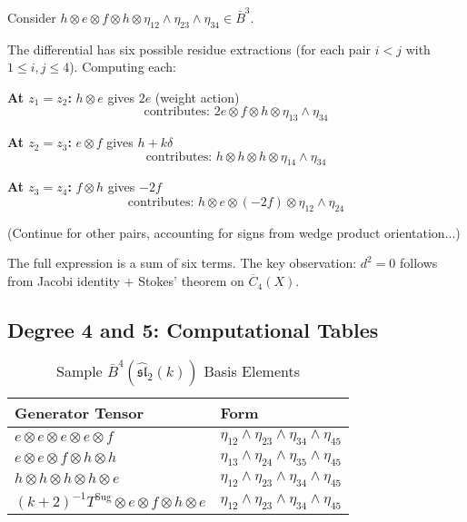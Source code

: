 \begin{computation}
Consider $h \otimes e \otimes f \otimes h \otimes \eta_{12} \wedge \eta_{23} \wedge \eta_{34} \in \bar{B}^3$.

The differential has six possible residue extractions (for each pair $i<j$ with $1 \le i,j \le 4$). Computing each:

\textbf{At $z_1=z_2$:} $h \otimes e$ gives $2e$ (weight action)
$$\text{contributes: } 2e \otimes f \otimes h \otimes \eta_{13} \wedge \eta_{34}$$

\textbf{At $z_2=z_3$:} $e \otimes f$ gives $h + k\delta$
$$\text{contributes: } h \otimes h \otimes h \otimes \eta_{14} \wedge \eta_{34}$$

\textbf{At $z_3=z_4$:} $f \otimes h$ gives $-2f$ 
$$\text{contributes: } h \otimes e \otimes (-2f) \otimes \eta_{12} \wedge \eta_{24}$$

(Continue for other pairs, accounting for signs from wedge product orientation...)

The full expression is a sum of six terms. The key observation: $d^2 = 0$ follows from Jacobi identity + Stokes' theorem on $\overline{C}_4(X)$.
\end{computation}

\subsection{Degree 4 and 5: Computational Tables}

\begin{table}[h]
\centering
\caption{Sample $\bar{B}^4(\widehat{\mathfrak{sl}}_2(k))$ Basis Elements}
\begin{tabular}{|l|l|}
\hline
\textbf{Generator Tensor} & \textbf{Form} \\
\hline
$e \otimes e \otimes e \otimes e \otimes f$ & $\eta_{12} \wedge \eta_{23} \wedge \eta_{34} \wedge \eta_{45}$ \\
$e \otimes e \otimes f \otimes h \otimes h$ & $\eta_{13} \wedge \eta_{24} \wedge \eta_{35} \wedge \eta_{45}$ \\
$h \otimes h \otimes h \otimes h \otimes e$ & $\eta_{12} \wedge \eta_{23} \wedge \eta_{34} \wedge \eta_{45}$ \\
$(k+2)^{-1}T^{\text{Sug}} \otimes e \otimes f \otimes h \otimes e$ & $\eta_{12} \wedge \eta_{23} \wedge \eta_{34} \wedge \eta_{45}$ \\
\hline
\end{tabular}
\end{table}

